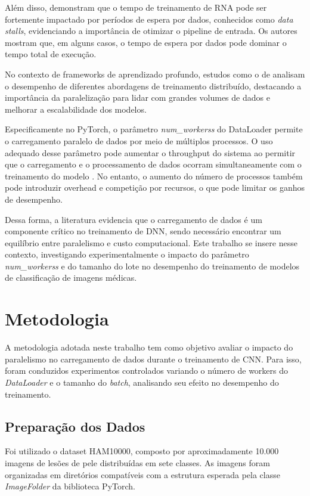 \documentclass[a4paper,11pt]{article}
\begin{document}
Além disso, \cite{mohan2020analyzing} demonstram que o tempo de treinamento de RNA pode ser fortemente impactado por períodos de espera por dados, conhecidos como \textit{data stalls}, evidenciando a importância de otimizar o pipeline de entrada. Os autores mostram que, em alguns casos, o tempo de espera por dados pode dominar o tempo total de execução.

No contexto de frameworks de aprendizado profundo, estudos como o de \cite{aach2023large} analisam o desempenho de diferentes abordagens de treinamento distribuído, destacando a importância da paralelização para lidar com grandes volumes de dados e melhorar a escalabilidade dos modelos.

Especificamente no PyTorch, o parâmetro \textit{num\_workerss} do DataLoader permite o carregamento paralelo de dados por meio de múltiplos processos. O uso adequado desse parâmetro pode aumentar o throughput do sistema ao permitir que o carregamento e o processamento de dados ocorram simultaneamente com o treinamento do modelo \cite{svogor2022profiling}. No entanto, o aumento do número de processos também pode introduzir overhead e competição por recursos, o que pode limitar os ganhos de desempenho.

Dessa forma, a literatura evidencia que o carregamento de dados é um componente crítico no treinamento de DNN, sendo necessário encontrar um equilíbrio entre paralelismo e custo computacional. Este trabalho se insere nesse contexto, investigando experimentalmente o impacto do parâmetro \textit{num\_workerss} e do tamanho do lote no desempenho do treinamento de modelos de classificação de imagens médicas.

\section{Metodologia}

A metodologia adotada neste trabalho tem como objetivo avaliar o impacto do paralelismo no carregamento de dados durante o treinamento de CNN. Para isso, foram conduzidos experimentos controlados variando o número de workers do \textit{DataLoader} e o tamanho do \textit{batch}, analisando seu efeito no desempenho do treinamento.

\subsection{Preparação dos Dados}

Foi utilizado o dataset HAM10000, composto por aproximadamente 10.000 imagens de lesões de pele distribuídas em sete classes. As imagens foram organizadas em diretórios compatíveis com a estrutura esperada pela classe \textit{ImageFolder} da biblioteca PyTorch. 
\end{document}
